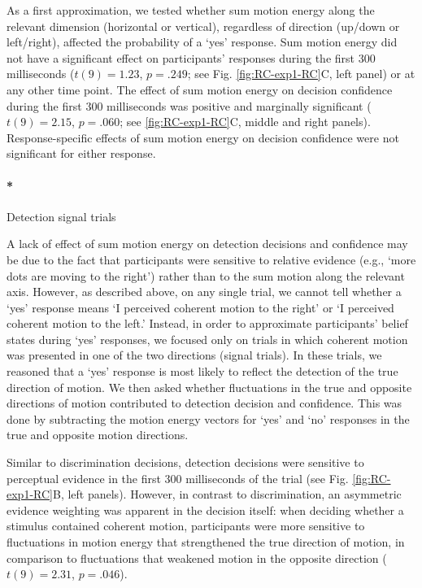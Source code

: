 \documentclass[
  english,
  man]{apa6}
\let\oldparagraph\paragraph
\renewcommand{\paragraph}[1]{\oldparagraph{#1}\mbox{}}
\begin{document}
As a first approximation, we tested whether sum motion energy along the relevant dimension (horizontal or vertical), regardless of direction (up/down or left/right), affected the probability of a `yes' response. Sum motion energy did not have a significant effect on participants' responses during the first 300 milliseconds (\(t(9) = 1.23\), \(p = .249\); see Fig. \ref{fig:RC-exp1-RC}C, left panel) or at any other time point. The effect of sum motion energy on decision confidence during the first 300 milliseconds was positive and marginally significant (\(t(9) = 2.15\), \(p = .060\); see \ref{fig:RC-exp1-RC}C, middle and right panels). Response-specific effects of sum motion energy on decision confidence were not significant for either response.

\hypertarget{detection-signal-trials}{%
\paragraph*{Detection signal trials}\label{detection-signal-trials}}

A lack of effect of sum motion energy on detection decisions and confidence may be due to the fact that participants were sensitive to relative evidence (e.g., `more dots are moving to the right') rather than to the sum motion along the relevant axis. However, as described above, on any single trial, we cannot tell whether a `yes' response means `I perceived coherent motion to the right' or `I perceived coherent motion to the left.' Instead, in order to approximate participants' belief states during `yes' responses, we focused only on trials in which coherent motion was presented in one of the two directions (signal trials). In these trials, we reasoned that a `yes' response is most likely to reflect the detection of the true direction of motion. We then asked whether fluctuations in the true and opposite directions of motion contributed to detection decision and confidence. This was done by subtracting the motion energy vectors for `yes' and `no' responses in the true and opposite motion directions.

Similar to discrimination decisions, detection decisions were sensitive to perceptual evidence in the first 300 milliseconds of the trial (see Fig. \ref{fig:RC-exp1-RC}B, left panels). However, in contrast to discrimination, an asymmetric evidence weighting was apparent in the decision itself: when deciding whether a stimulus contained coherent motion, participants were more sensitive to fluctuations in motion energy that strengthened the true direction of motion, in comparison to fluctuations that weakened motion in the opposite direction (\(t(9) = 2.31\), \(p = .046\)).
\end{document}
